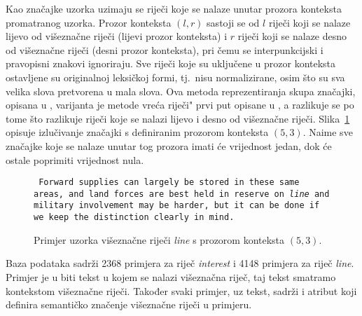 \documentclass[10pt, a4paper]{article}
\begin{document}
Kao značajke uzorka uzimaju se riječi koje se nalaze unutar prozora konteksta promatranog uzorka.
Prozor konteksta $(l,r)$  sastoji se
od $l$ riječi koji se nalaze lijevo od višeznačne riječi (lijevi prozor konteksta) 
i $r$ riječi koji se nalaze desno od višeznačne riječi (desni prozor konteksta), pri čemu se
interpunkcijski i pravopisni znakovi ignoriraju. Sve riječi koje su uključene u prozor konteksta ostavljene su originalnoj leksičkoj formi, tj.~nisu normalizirane, osim što su sva velika
slova pretvorena u mala slova. 
Ova metoda reprezentiranja skupa značajki,
opisana u \citep{pedersen}, varijanta je metode \glqq vreća riječi"  
prvi put opisane u \citep{gale-etc}, a razlikuje se po tome što razlikuje 
riječi koje se nalazi lijevo i desno od višeznačne riječi. \mbox{Slika \ref{window_of_context}}
opisuje izlučivanje značajki s definiranim prozorom konteksta $(5,3)$. Naime sve značajke koje
se nalaze unutar tog prozora imati će vrijednost jedan, dok će ostale poprimiti vrijednost nula.

\begin{figure}[!hbtp]
{\small \texttt{     Forward supplies can largely be stored in these same areas, and land forces are best held in reserve on  \emph{line}  and military involvement may be harder, but it can be done if we keep the distinction clearly in mind.}}
\caption{Primjer uzorka višeznačne riječi \emph{line} s prozorom konteksta $(5, 3)$.\label{window_of_context}}
\end{figure}

Baza podataka sadrži 2368 primjera za riječ \emph{interest} i 4148 primjera za riječ \emph{line}.
Primjer je u biti tekst u kojem se nalazi višeznačna riječ, taj tekst smatramo
kontekstom višeznačne riječi. Također svaki primjer, uz tekst, sadrži i atribut koji 
definira semantičko značenje višeznačne riječi u primjeru.


\end{document}
